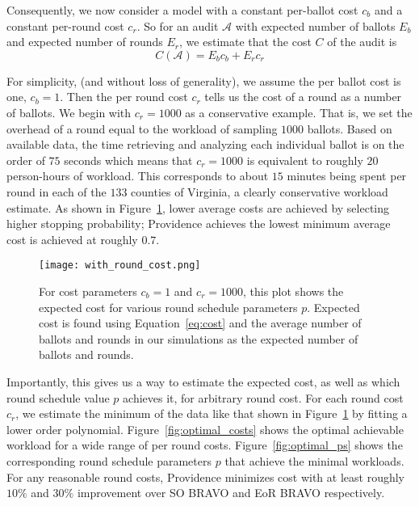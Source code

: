 Consequently, we now consider a model with a constant per-ballot cost $c_b$ and a constant per-round cost $c_r$.
So for an audit $\mathcal{A}$ with expected number of ballots $E_{b}$ and expected number of rounds $E_{r}$, we estimate that the cost $C$ of the audit is
\begin{equation}
C(\mathcal{A}) = E_b c_b + E_r c_r
\label{eq:round_cost}
\end{equation}

For simplicity, (and without loss of generality), we assume the per ballot cost is one, $c_b=1$. Then the per round cost $c_r$ tells us the cost of a round as a number of ballots. We begin with $c_r=1000$ as a conservative example. 
That is, we set the overhead of a round equal to the workload of sampling $1000$ ballots. Based on available data\cite{RI-report}, the time retrieving and analyzing each individual ballot is on the order of $75$ seconds which means that $c_r=1000$ is equivalent to roughly $20$ person-hours of workload. This corresponds to about $15$ minutes being spent per round in each of the $133$ counties of Virginia, a clearly conservative workload estimate. 
As shown in Figure~\ref{fig:with_round_cost}, lower average costs are achieved by selecting higher stopping probability; Providence achieves the lowest minimum average cost is achieved at roughly $0.7$.

\begin{figure}
\texttt{[image: with\_round\_cost.png]}
\caption{For cost parameters $c_b=1$ and $c_r=1000$, this plot shows the expected cost for various round schedule parameters $p$. Expected cost is found using Equation~\ref{eq:cost} and the average number of ballots and rounds in our simulations as the expected number of ballots and rounds.}
\label{fig:with_round_cost}
\end{figure}

Importantly, this gives us a way to estimate the expected cost, as well as which round schedule value $p$ achieves it, for arbitrary round cost. For each round cost $c_r$, we estimate the minimum of the data like that shown in Figure~\ref{fig:with_round_cost} by fitting a lower order polynomial.
Figure~\ref{fig:optimal_costs} shows the optimal achievable workload for a wide range of per round costs. Figure~\ref{fig:optimal_ps} shows the corresponding round schedule parameters $p$ that achieve the minimal workloads. For any reasonable round costs, Providence minimizes cost with at least roughly $10\%$ and $30\%$ improvement over SO BRAVO and EoR BRAVO respectively.


